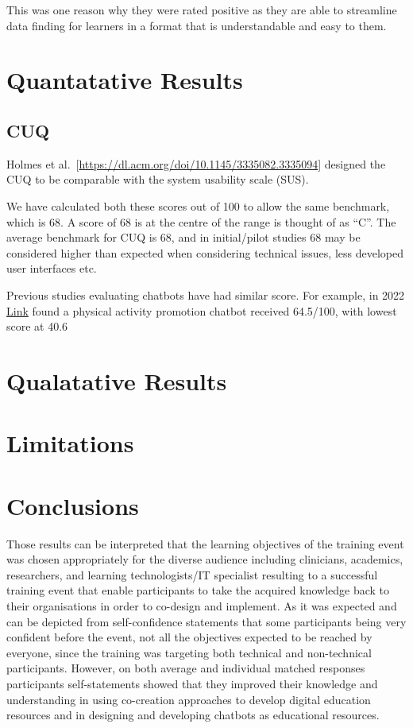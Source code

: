 \documentclass[a4paper, nobind]{templates/ociamthesis}
\begin{document}
This was one reason why they were rated positive as they are able to streamline data finding for learners in a format that is understandable and easy to them.

\hypertarget{quantatative-results}{%
\section{Quantatative Results}\label{quantatative-results}}

\hypertarget{cuq}{%
\subsection{CUQ}\label{cuq}}

Holmes et al.~{[}\url{https://dl.acm.org/doi/10.1145/3335082.3335094}{]} designed the CUQ to be comparable with the system usability scale (SUS).

We have calculated both these scores out of 100 to allow the same benchmark, which is 68.
A score of 68 is at the centre of the range is thought of as ``C''.
The average benchmark for CUQ is 68, and in initial/pilot studies 68 may be considered higher than expected when considering technical issues, less developed user interfaces etc.

Previous studies evaluating chatbots have had similar score.
For example, in 2022 \href{a\%3C\%20href=}{Link} found a physical activity promotion chatbot received 64.5/100, with lowest score at 40.6

\hypertarget{qualatative-results}{%
\section{Qualatative Results}\label{qualatative-results}}

\hypertarget{limitations}{%
\section{Limitations}\label{limitations}}

\hypertarget{conclusions}{%
\section{Conclusions}\label{conclusions}}

Those results can be interpreted that the learning objectives of the training event was chosen appropriately for the diverse audience including clinicians, academics, researchers, and learning technologists/IT specialist resulting to a successful training event that enable participants to take the acquired knowledge back to their organisations in order to co-design and implement.
As it was expected and can be depicted from self-confidence statements that some participants being very confident before the event, not all the objectives expected to be reached by everyone, since the training was targeting both technical and non-technical participants.
However, on both average and individual matched responses participants self-statements showed that they improved their knowledge and understanding in using co-creation approaches to develop digital education resources and in designing and developing chatbots as educational resources.
\end{document}
